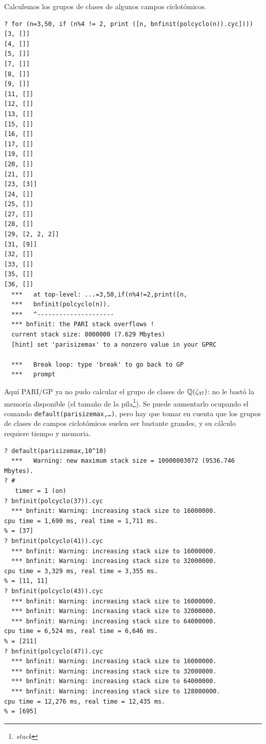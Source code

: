 \begin{ejemplo}
  Calculemos los grupos de clases de algunos campos ciclotómicos.

  \begin{shaded}
\begin{verbatim}
? for (n=3,50, if (n%4 != 2, print ([n, bnfinit(polcyclo(n)).cyc])))
[3, []]
[4, []]
[5, []]
[7, []]
[8, []]
[9, []]
[11, []]
[12, []]
[13, []]
[15, []]
[16, []]
[17, []]
[19, []]
[20, []]
[21, []]
[23, [3]]
[24, []]
[25, []]
[27, []]
[28, []]
[29, [2, 2, 2]]
[31, [9]]
[32, []]
[33, []]
[35, []]
[36, []]
  ***   at top-level: ...=3,50,if(n%4!=2,print([n,
  ***   bnfinit(polcyclo(n)).
  ***   ^---------------------
  *** bnfinit: the PARI stack overflows !
  current stack size: 8000000 (7.629 Mbytes)
  [hint] set 'parisizemax' to a nonzero value in your GPRC

  ***   Break loop: type 'break' to go back to GP 
  ***   prompt
\end{verbatim}
  \end{shaded}

  Aquí PARI/GP ya no pudo calcular el grupo de clases de $\mathbb{Q} (\zeta_{37})$:
  no le bastó la memoria disponible (el tamaño de la
  pila\footnote{\emph{stack}}). Se puede aumentarlo ocupando el comando
  \texttt{default(parisizemax,\dots)}, pero hay que tomar en cuenta que los
  grupos de clases de campos ciclotómicos suelen ser bastante grandes, y su
  cálculo requiere tiempo y memoria.

  \begin{shaded}
\begin{verbatim}
? default(parisizemax,10^10)
  ***   Warning: new maximum stack size = 10000003072 (9536.746 Mbytes).
? #
   timer = 1 (on)
? bnfinit(polcyclo(37)).cyc
  *** bnfinit: Warning: increasing stack size to 16000000.
cpu time = 1,690 ms, real time = 1,711 ms.
% = [37]
? bnfinit(polcyclo(41)).cyc
  *** bnfinit: Warning: increasing stack size to 16000000.
  *** bnfinit: Warning: increasing stack size to 32000000.
cpu time = 3,329 ms, real time = 3,355 ms.
% = [11, 11]
? bnfinit(polcyclo(43)).cyc
  *** bnfinit: Warning: increasing stack size to 16000000.
  *** bnfinit: Warning: increasing stack size to 32000000.
  *** bnfinit: Warning: increasing stack size to 64000000.
cpu time = 6,524 ms, real time = 6,646 ms.
% = [211]
? bnfinit(polcyclo(47)).cyc
  *** bnfinit: Warning: increasing stack size to 16000000.
  *** bnfinit: Warning: increasing stack size to 32000000.
  *** bnfinit: Warning: increasing stack size to 64000000.
  *** bnfinit: Warning: increasing stack size to 128000000.
cpu time = 12,276 ms, real time = 12,435 ms.
% = [695]
\end{verbatim}
  \end{shaded}
\end{ejemplo}

